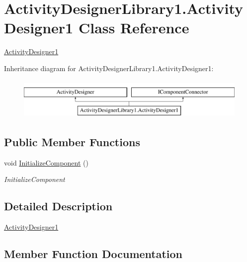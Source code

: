 \hypertarget{class_activity_designer_library1_1_1_activity_designer1}{}\section{Activity\+Designer\+Library1.\+Activity\+Designer1 Class Reference}
\label{class_activity_designer_library1_1_1_activity_designer1}


\hyperlink{class_activity_designer_library1_1_1_activity_designer1}{Activity\+Designer1}  


Inheritance diagram for Activity\+Designer\+Library1.\+Activity\+Designer1\+:\begin{figure}[H]
\begin{center}
\leavevmode
\includegraphics[height=2.000000cm]{class_activity_designer_library1_1_1_activity_designer1}
\end{center}
\end{figure}
\subsection*{Public Member Functions}
\begin{DoxyCompactItemize}
\item 
void \hyperlink{class_activity_designer_library1_1_1_activity_designer1_a1c79b52865a8360b0a02e7305d818eb2}{Initialize\+Component} ()
\begin{DoxyCompactList}\small\item\em Initialize\+Component \end{DoxyCompactList}\end{DoxyCompactItemize}


\subsection{Detailed Description}
\hyperlink{class_activity_designer_library1_1_1_activity_designer1}{Activity\+Designer1} 



\subsection{Member Function Documentation}
